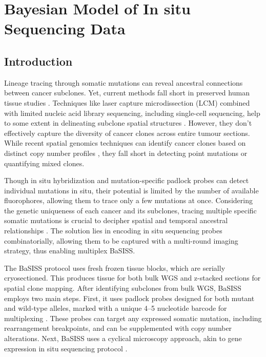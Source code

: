 \chapter{Bayesian Model of In situ Sequencing Data}

\section{Introduction}

Lineage tracing through somatic mutations can reveal ancestral connections between cancer subclones. Yet, current methods fall short in preserved human tissue studies \parencite{Yates2015-eg,Jamal-Hanjani2017-ed,Jones2008-tg,Shah2009-lx,Casasent2018-gx,Tarabichi2021-xx}. Techniques like laser capture microdissection (LCM) combined with limited nucleic acid library sequencing, including single-cell sequencing, help to some extent in delineating subclone spatial structures \parencite{Shen2000-xj,Casasent2018-gx}. However, they don't effectively capture the diversity of cancer clones across entire tumour sections. While recent spatial genomics techniques can identify cancer clones based on distinct copy number profiles \parencite{Zhao2022-dp,Erickson2022-mq}, they fall short in detecting point mutations or quantifying mixed clones.

Though in situ hybridization \parencite{Janiszewska2015-kb} and mutation-specific padlock probes \parencite{Larsson2010-bp,Grundberg2013-te,Ke2013-km,Baker2017-jz} can detect individual mutations in situ, their potential is limited by the number of available fluorophores, allowing them to trace only a few mutations at once. Considering the genetic uniqueness of each cancer and its subclones, tracing multiple specific somatic mutations is crucial to decipher spatial and temporal ancestral relationships \parencite{Nik-Zainal2012-tt}. The solution lies in encoding in situ sequencing probes combinatorially, allowing them to be captured with a multi-round imaging strategy, thus enabling multiplex \ac{BaSISS}.

The \ac{BaSISS} protocol uses fresh frozen tissue blocks, which are serially cryosectioned. This produces tissue for both bulk \ac{WGS} and z-stacked sections for spatial clone mapping. After identifying subclones from bulk WGS, \ac{BaSISS} employs two main steps. First, it uses padlock probes designed for both mutant and wild-type alleles, marked with a unique 4–5 nucleotide barcode for multiplexing \parencite{Ke2013-km}. These probes can target any expressed somatic mutation, including rearrangement breakpoints, and can be supplemented with copy number alterations. Next, \ac{BaSISS}  uses a cyclical microscopy approach, akin to gene expression in situ sequencing protocol \parencite{Ke2013-km,Svedlund2019-xb}.

